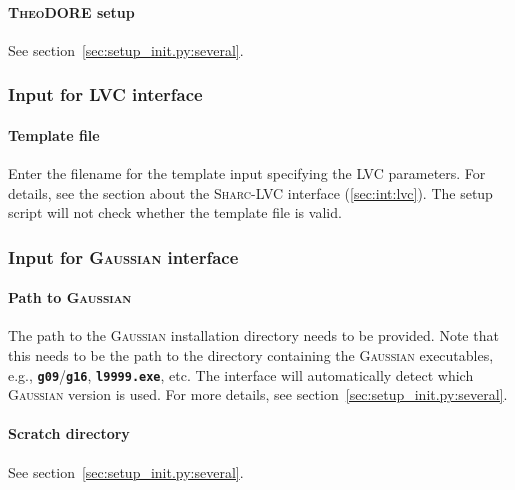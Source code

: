 \documentclass[a4paper,10pt,DIV=15,openany]{scrbook}
\newcommand{\sharc}{\textsc{Sharc}}
\newcommand{\ttt}[1]{\textbf{\texttt{#1}}}
\begin{document}
\paragraph{\textsc{TheoDORE} setup}

See section~\ref{sec:setup_init.py:several}.


\subsubsection{Input for LVC interface}\label{sec:setup_init.py:lvc}

\paragraph{Template file}

Enter the filename for the template input specifying the LVC parameters. For details, see the section about the \sharc-LVC interface (\ref{sec:int:lvc}). The setup script will not check whether the template file is valid. 


\subsubsection{Input for \textsc{Gaussian} interface}\label{sec:setup_init.py:gaussian}

\paragraph{Path to \textsc{Gaussian}}

The path to the \textsc{Gaussian} installation directory needs to be provided.
Note that this needs to be the path to the directory containing the \textsc{Gaussian} executables, e.g., \ttt{g09}/\ttt{g16}, \ttt{l9999.exe}, etc.
The interface will automatically detect which \textsc{Gaussian} version is used.
For more details, see section~\ref{sec:setup_init.py:several}.

\paragraph{Scratch directory}

See section~\ref{sec:setup_init.py:several}.
\end{document}
